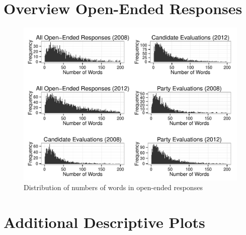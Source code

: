 \documentclass[12pt]{article}
\begin{document}


\clearpage
\section{Overview Open-Ended Responses}\label{app:oview}
\renewcommand\thefigure{\thesection.\arabic{figure}}
\renewcommand\thetable{\thesection.\arabic{table}}
\setcounter{figure}{0}
\setcounter{table}{0}



\begin{figure}[ht]\centering
\includegraphics[scale=.8]{../calc/fig/appB2num.pdf}
\caption{Distribution of numbers of words in open-ended responses}\label{fig:appB2num}
\end{figure}

\clearpage
\section{Additional Descriptive Plots}\label{app:desc}
\renewcommand\thefigure{\thesection.\arabic{figure}}
\renewcommand\thetable{\thesection.\arabic{table}}
\setcounter{figure}{0}
\setcounter{table}{0}
\end{document}
